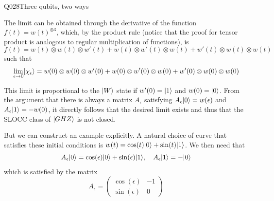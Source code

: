 \begin{entry}{Q028}{Three qubits, two ways}
\begin{solution}[c]
The limit can be obtained through the derivative of the function $f(t)=w(t)^{\otimes3}$, which, by the product rule (notice that the proof for tensor product is analogous to regular multiplication of functions), is
\begin{equation}
    f(t) = w(t)\otimes w(t) \otimes w'(t) + w(t)\otimes w'(t) \otimes w(t) + w'(t)\otimes w(t) \otimes w(t)
\end{equation}
such that 
\begin{equation}
    \lim_{\epsilon \rightarrow 0} \lvert \chi_\epsilon \rangle= w(0)\otimes w(0) \otimes w'(0) + w(0)\otimes w'(0) \otimes w(0) + w'(0)\otimes w(0) \otimes w(0)
\end{equation}

This limit is proportional to the $\lvert W \rangle$ state if $w'(0)=\lvert 1 \rangle$ and $w(0)=\lvert 0 \rangle$. From the argument that there is always a matrix $A_\epsilon$ satisfying $A_\epsilon\lvert 0 \rangle=w(\epsilon)$ and $A_\epsilon\lvert 1 \rangle=-w(0)$, it directly follows that the desired limit exists and thus that the SLOCC class of $\lvert GHZ \rangle$ is not closed.
 
 But we can construct an example explicitly. A natural choice of curve that satisfies these initial conditions is $w(t)=\cos(t)\lvert 0 \rangle+\sin(t)\lvert 1 \rangle$. We then need that
 \begin{equation}
     A_\epsilon \lvert 0 \rangle = \cos(\epsilon) \lvert 0 \rangle + \sin(\epsilon)\lvert 1 \rangle, \quad A_\epsilon \lvert 1 \rangle = -\lvert 0 \rangle
 \end{equation}
 which is satisfied by the matrix 
 \begin{equation}
     A_\epsilon = \begin{pmatrix}
         \cos(\epsilon)  &  -1 \\
          \sin(\epsilon) & 0
     \end{pmatrix}
 \end{equation}

\end{solution}




\begin{takeaway}
\end{takeaway}


\end{entry}